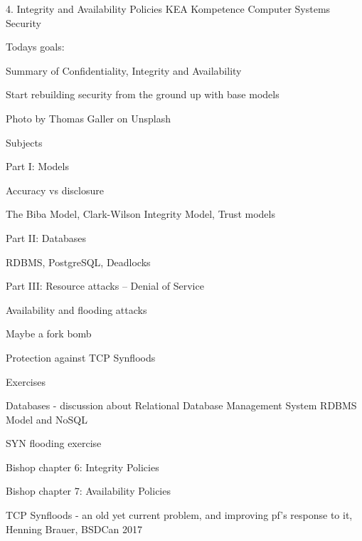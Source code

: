 \documentclass[Screen16to9,17pt]{foils}
\begin{document}
\mytitlepage
{4. Integrity and Availability Policies}
{KEA Kompetence Computer Systems Security \the\year}



Todays goals:
\begin{list2}
\item Summary of Confidentiality, Integrity and Availability
\item Start rebuilding security from the ground up with base models
\end{list2}

  Photo by Thomas Galler on Unsplash


\begin{list1}
\item Subjects
\item Part I: Models
\begin{list2}
\item Accuracy vs disclosure
\item The Biba Model, Clark-Wilson Integrity Model, Trust models
\end{list2}
\item Part II: Databases
\begin{list2}
\item RDBMS, PostgreSQL, Deadlocks
\end{list2}
\item Part III: Resource attacks -- Denial of Service
\begin{list2}
\item Availability and flooding attacks
\item Maybe a fork bomb
\item Protection against TCP Synfloods
\end{list2}
\item Exercises
\begin{list2}
\item Databases - discussion about Relational Database Management System RDBMS Model and NoSQL
\item SYN flooding exercise
\end{list2}
\end{list1}




\begin{list1}
\item Bishop chapter 6: Integrity Policies
\item Bishop chapter 7: Availability Policies
\item TCP Synfloods - an old yet current problem, and improving pf's response to it, Henning Brauer, BSDCan 2017
\end{list1}
\end{document}
